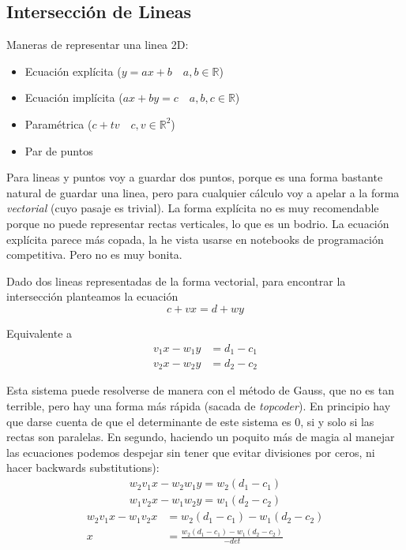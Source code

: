 \documentclass{article}
\begin{document}
\subsection*{Intersección de Lineas}

Maneras de representar una linea 2D:
\begin{itemize}
    \item Ecuación explícita ($y = ax + b \quad a, b \in \mathds{R}$)
    \item Ecuación implícita ($ax + by = c \quad a, b, c \in \mathds{R}$)
    \item Paramétrica ($c + tv \quad c, v \in \mathds{R}^2$)
    \item Par de puntos
\end{itemize}

Para lineas y puntos voy a guardar dos puntos, porque es una forma bastante natural de guardar una linea, pero para cualquier cálculo voy a apelar a la forma \textit{vectorial} (cuyo pasaje es trivial). La forma explícita no es muy recomendable porque no puede representar rectas verticales, lo que es un bodrio. La ecuación explícita parece más copada, la he vista usarse en notebooks de programación competitiva. Pero no es muy bonita.

Dado dos lineas representadas de la forma vectorial, para encontrar la intersección planteamos la ecuación
\begin{equation*}
    c + vx = d + wy
\end{equation*}

Equivalente a 
\begin{align*}
    v_1x - w_1y &= d_1 - c_1 \\
    v_2x - w_2y &= d_2 - c_2
\end{align*}

Esta sistema puede resolverse de manera con el método de Gauss, que no es tan terrible, pero hay una forma más rápida (sacada de \textit{topcoder}). En principio hay que darse cuenta de que el determinante de este sistema es $0$, si y solo si las rectas son paralelas. En segundo, haciendo un poquito más de magia al manejar las ecuaciones podemos despejar sin tener que evitar divisiones por ceros, ni hacer backwards substitutions):
\begin{align*}
    w_2 v_1x - w_2 w_1y = w_2 (d_1 - c_1) \\
    w_1 v_2x - w_1 w_2y = w_1 (d_2 - c_2)
\end{align*}
\begin{align*}
    w_2 v_1x - w_1 v_2x &= w_2 (d_1 - c_1) - w_1 (d_2 - c_2) \\
                      x &= \frac{w_2 (d_1 - c_1) - w_1 (d_2 - c_2)}{-det}
\end{align*}
\end{document}
